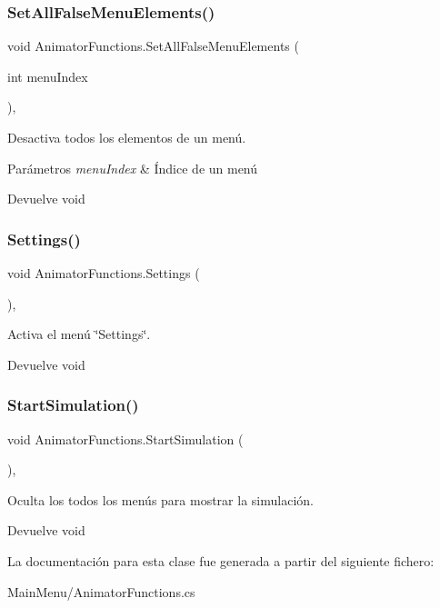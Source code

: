 \subsubsection{\texorpdfstring{SetAllFalseMenuElements()}{SetAllFalseMenuElements()}}
{\footnotesize\ttfamily void Animator\+Functions.\+Set\+All\+False\+Menu\+Elements (\begin{DoxyParamCaption}\item[{int}]{menu\+Index }\end{DoxyParamCaption})\hspace{0.3cm}{\ttfamily [inline]}, {\ttfamily [private]}}

Desactiva todos los elementos de un menú. 
\begin{DoxyParams}{Parámetros}
{\em menu\+Index} & Índice de un menú \\
\hline
\end{DoxyParams}
\begin{DoxyReturn}{Devuelve}
void 
\end{DoxyReturn}
\mbox{\label{class_animator_functions_ab3731a6646ff8ba1174de3e910e0ae0c}} 
\subsubsection{\texorpdfstring{Settings()}{Settings()}}
{\footnotesize\ttfamily void Animator\+Functions.\+Settings (\begin{DoxyParamCaption}{ }\end{DoxyParamCaption})\hspace{0.3cm}{\ttfamily [inline]}, {\ttfamily [private]}}

Activa el menú \char`\"{}\+Settings\char`\"{}. \begin{DoxyReturn}{Devuelve}
void 
\end{DoxyReturn}
\mbox{\label{class_animator_functions_a22bbcad1e4c262029e07b4203f0f466a}} 
\subsubsection{\texorpdfstring{StartSimulation()}{StartSimulation()}}
{\footnotesize\ttfamily void Animator\+Functions.\+Start\+Simulation (\begin{DoxyParamCaption}{ }\end{DoxyParamCaption})\hspace{0.3cm}{\ttfamily [inline]}, {\ttfamily [private]}}

Oculta los todos los menús para mostrar la simulación. \begin{DoxyReturn}{Devuelve}
void 
\end{DoxyReturn}


La documentación para esta clase fue generada a partir del siguiente fichero\+:\begin{DoxyCompactItemize}
\item 
Main\+Menu/Animator\+Functions.\+cs\end{DoxyCompactItemize}
